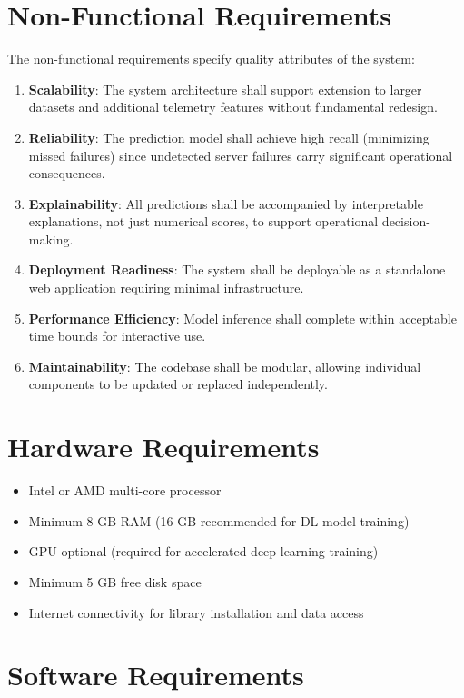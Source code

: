 \documentclass[12pt,letterpaper]{report}
\begin{document}
\section{Non-Functional Requirements}

The non-functional requirements specify quality attributes of the system:

\begin{enumerate}[label=NFR\arabic*:]
  \item \textbf{Scalability}: The system architecture shall support extension to larger datasets and additional telemetry features without fundamental redesign.
  \item \textbf{Reliability}: The prediction model shall achieve high recall (minimizing missed failures) since undetected server failures carry significant operational consequences.
  \item \textbf{Explainability}: All predictions shall be accompanied by interpretable explanations, not just numerical scores, to support operational decision-making.
  \item \textbf{Deployment Readiness}: The system shall be deployable as a standalone web application requiring minimal infrastructure.
  \item \textbf{Performance Efficiency}: Model inference shall complete within acceptable time bounds for interactive use.
  \item \textbf{Maintainability}: The codebase shall be modular, allowing individual components to be updated or replaced independently.
\end{enumerate}

\section{Hardware Requirements}

\begin{itemize}
  \item Intel or AMD multi-core processor
  \item Minimum 8 GB RAM (16 GB recommended for DL model training)
  \item GPU optional (required for accelerated deep learning training)
  \item Minimum 5 GB free disk space
  \item Internet connectivity for library installation and data access
\end{itemize}

\section{Software Requirements}
\end{document}
